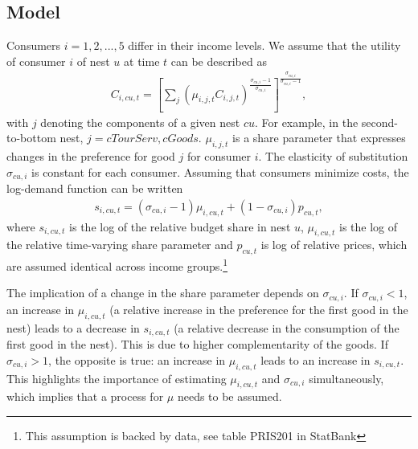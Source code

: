 \subsection{Model}
Consumers $i=1,2,...,5$ differ in their income levels. We assume that the utility  of consumer $i$ of nest $u$ at time $t$ can be described as
\begin{align}\label{utileq}
    C_{i,cu,t} = \left[\sum_j (\mu_{i,j,t} C_{i,j,t})^{\frac{\sigma_{cu,i}-1}{\sigma_{cu,i}}}\right]^{\frac{\sigma_{cu,i}}{\sigma_{cu,i}-1}},
\end{align}
with $j$ denoting the components of a given nest $cu$. For example, in the second-to-bottom nest, $j=cTourServ,cGoods$. $\mu_{i,j,t}$ is a share parameter that expresses changes in the preference for good $j$ for consumer $i$. The elasticity of substitution $\sigma_{cu,i}$ is constant for each consumer. Assuming that consumers minimize costs, the log-demand function can be written
\begin{align}\label{demandeq}
    s_{i,cu,t}= (\sigma_{cu,i}-1) \mu_{i,cu,t} + (1-\sigma_{cu,i}) p_{cu,t},
\end{align}
where $s_{i,cu,t}$ is the log of the relative budget share in nest $u$, $\mu_{i,cu,t}$ is the log of the relative time-varying share parameter and $p_{cu,t}$ is log of relative prices, which are assumed identical across income groups.\footnote{This assumption is backed by data, see table PRIS201 in StatBank} 

The implication of a change in the share parameter depends on $\sigma_{cu,i}$. If $\sigma_{cu,i}<1$, an increase in $\mu_{i,cu,t}$ (a relative increase in the preference for the first good in the nest) leads to a decrease in $s_{i,cu,t}$ (a relative decrease in the consumption of the first good in the nest). This is due to higher complementarity of the goods. If $\sigma_{cu,i}>1$, the opposite is true: an increase in $\mu_{i,cu,t}$ leads to an increase in $s_{i,cu,t}$. This highlights the importance of estimating $\mu_{i,cu,t}$ and $\sigma_{cu,i}$ simultaneously, which implies that a process for $\mu$ needs to be assumed. 

